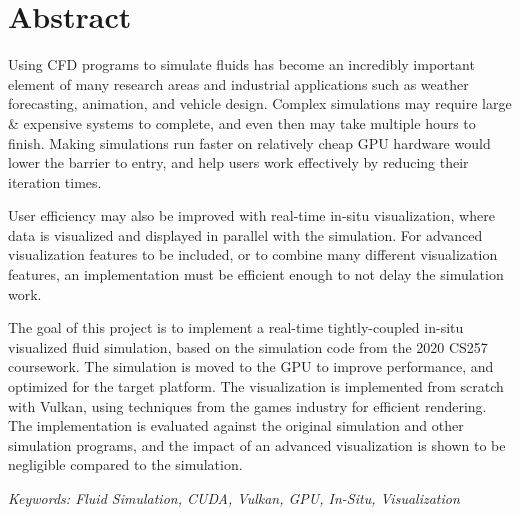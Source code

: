 
\section*{Abstract}
\vspace{1.5cm}

\large

Using CFD programs to simulate fluids has become an incredibly important element of many research areas and industrial applications such as weather forecasting, animation, and vehicle design.
Complex simulations may require large \& expensive systems to complete, and even then may take multiple hours to finish.
Making simulations run faster on relatively cheap GPU hardware would lower the barrier to entry, and help users work effectively by reducing their iteration times.

User efficiency may also be improved with real-time in-situ visualization, where data is visualized and displayed in parallel with the simulation.
For advanced visualization features to be included, or to combine many different visualization features, an implementation must be efficient enough to not delay the simulation work.

The goal of this project is to implement a 
real-time tightly-coupled in-situ visualized fluid simulation, based on the simulation code from the 2020 CS257 coursework.
The simulation is moved to the GPU to improve performance, and optimized for the target platform.
The visualization is implemented from scratch with Vulkan, using techniques from the games industry for efficient rendering.
The implementation is evaluated against the original simulation and other simulation programs, and the impact of an advanced visualization is shown to be negligible compared to the simulation.

\vspace{0.5cm}

\noindent \textit{Keywords: Fluid Simulation, CUDA, Vulkan, GPU, In-Situ, Visualization}